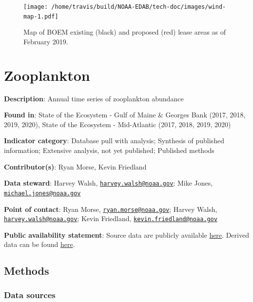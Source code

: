 \documentclass[
]{book}
\begin{document}
\begin{figure}
\centering
\texttt{[image: /home/travis/build/NOAA-EDAB/tech-doc/images/wind-map-1.pdf]}
\caption{\label{fig:wind-map}Map of BOEM existing (black) and proposed (red) lease areas as of February 2019.}
\end{figure}

\hypertarget{zooabund}{%
\chapter{Zooplankton}\label{zooabund}}

\textbf{Description}: Annual time series of zooplankton abundance

\textbf{Found in}: State of the Ecosystem - Gulf of Maine \& Georges Bank (2017, 2018, 2019, 2020), State of the Ecosystem - Mid-Atlantic (2017, 2018, 2019, 2020)

\textbf{Indicator category}: Database pull with analysis; Synthesis of published information; Extensive analysis, not yet published; Published methods

\textbf{Contributor(s)}: Ryan Morse, Kevin Friedland

\textbf{Data steward}: Harvey Walsh, \href{mailto:harvey.walsh@noaa.gov}{\nolinkurl{harvey.walsh@noaa.gov}}; Mike Jones, \href{mailto:michael.jones@noaa.gov}{\nolinkurl{michael.jones@noaa.gov}}

\textbf{Point of contact}: Ryan Morse, \href{mailto:ryan.morse@noaa.gov}{\nolinkurl{ryan.morse@noaa.gov}}; Harvey Walsh, \href{mailto:harvey.walsh@noaa.gov}{\nolinkurl{harvey.walsh@noaa.gov}}; Kevin Friedland, \href{mailto:kevin.friedland@noaa.gov}{\nolinkurl{kevin.friedland@noaa.gov}}

\textbf{Public availability statement}: Source data are publicly available \href{ftp://ftp.nefsc.noaa.gov/pub/hydro/zooplankton_data/}{here}. Derived data can be found \href{https://comet.nefsc.noaa.gov/erddap/tabledap/zoo_abundance_soe_v1.html}{here}.

\hypertarget{methods-46}{%
\section{Methods}\label{methods-46}}

\hypertarget{data-sources-45}{%
\subsection{Data sources}\label{data-sources-45}}
\end{document}
